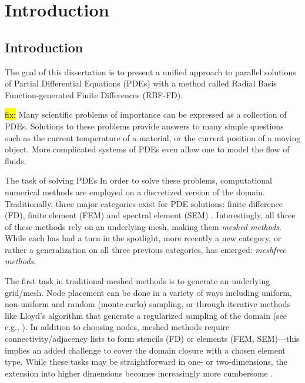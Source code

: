 
\chapter{Introduction}

\section{Introduction}
\label{sec:intro}

The goal of this dissertation is to present a unified approach
to parallel solutions of Partial Differential Equations (PDEs)
with a method called Radial Basis Function-generated Finite
Differences (RBF-FD).

\hl{fix:}
Many scientific problems of importance can be expressed as a
collection of PDEs. Solutions to these problems provide answers to many simple
questions such as the current temperature of a material, or the
current position of a moving object. More complicated systems of
PDEs even allow one to model the flow of fluids.

The task of solving PDEs 
In order to solve these problems, computational numerical
methods are employed on a discretized version of the domain.
Traditionally, three major categories exist for PDE solutions:
finite difference (FD), finite element (FEM) and spectral
element (SEM) \cite{Fasshauer:2007}. Interestingly, all three of
these methods rely on an underlying mesh, making them
\emph{meshed methods}. While each has had a turn in the
spotlight, more recently a new category, or rather a
generalization on all three previous categories, has emerged:
\emph{meshfree methods}.

The first task in traditional meshed methods is to generate an
underlying grid/mesh. Node placement can be done in a variety of
ways including uniform, non-uniform and random (monte carlo)
sampling, or through iterative methods like Lloyd's algorithm
that generate a regularized sampling of the domain (see e.g.,
\cite{Du:1999}). In addition to choosing nodes, meshed methods
require connectivity/adjacency lists to form stencils (FD) or
elements (FEM, SEM)---this implies an added challenge to cover
the domain closure with a chosen element type. While these tasks
may be straightforward in one- or two-dimensions, the extension
into higher dimensions becomes increasingly more cumbersome
\cite{Li:2007}. 


